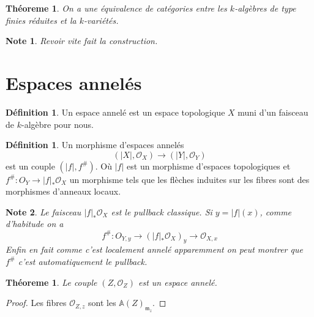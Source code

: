 \documentclass[a4paper,12pt]{book}
\newcommand{\A}{\mathbb{A}}
\newcommand{\Or}{\mathcal{O}}
\newcommand{\m}{\mathfrak{m}}
\theoremstyle{plain}
\newtheorem{thm}[subsection]{Théoreme}
\newtheorem{note}{Note}
\theoremstyle{definition}
\newtheorem{defn}[subsection]{Définition}
\theoremstyle{remark}
\begin{document}
\begin{thm}
    On a une équivalence de catégories entre les $k$-algèbres
    de type finies réduites et la $k$-variétés.
\end{thm}
\begin{note}
    Revoir vite fait la construction.
\end{note}
\section{Espaces annelés}
\begin{defn}
    Un espace annelé est un espace topologique $X$ muni d'un faisceau
    de $k$-algèbre pour nous.
\end{defn}

\begin{defn}
    Un morphisme d'espaces annelés 
    \[(|X|,\Or_X)\to (|Y|, \Or_Y)\] 
    est un couple $(|f|, f^{\#})$. Où 
    $|f|$ est un morphisme d'espaces topologiques et
    $f^{\#}\colon O_Y\to |f|_*\Or_X$
    un morphisme tels que les flèches induites sur 
    les fibres sont des morphismes d'anneaux 
    locaux.
\end{defn}
\begin{note}
    Le faisceau $|f|_*\Or_X$ est le pullback classique. Si
    $y=|f|(x)$, comme d'habitude on a 
    \[f^\#\colon O_{Y,y}\to (|f|_*\Or_X)_y\to \Or_{X,x}\]
    Enfin en fait comme c'est localement annelé apparemment on 
    peut montrer que $f^\#$ c'est automatiquement le pullback.
\end{note}
\begin{thm}
    Le couple $(Z,\Or_Z)$ est un espace annelé.
\end{thm}
\begin{proof}
    Les fibres $\Or_{Z,z}$ sont les $\A(Z)_{\m_z}$.
\end{proof}


\printbibliography
\end{document}
